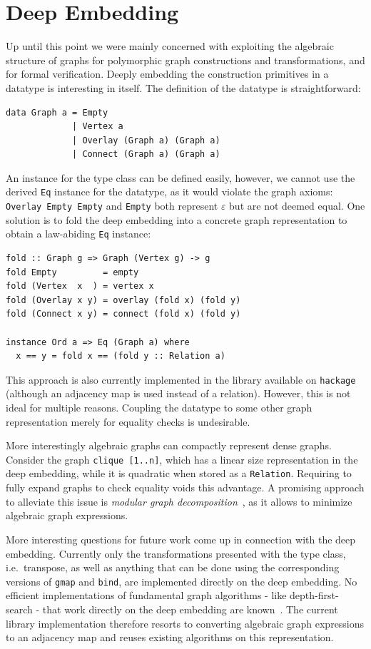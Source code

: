 \documentclass{article}
\newcommand{\hs}{\texttt}
\renewcommand{\epsilon}{\varepsilon}
\newcommand{\eps}{\epsilon}
\begin{document}
\section{Deep Embedding}\label{sec:deep}
Up until this point we were mainly concerned with exploiting the algebraic
structure of graphs for polymorphic graph constructions and transformations, and
for formal verification. Deeply embedding the construction primitives in a
datatype is interesting in itself. The definition of the datatype is
straightforward:
\begin{verbatim}
data Graph a = Empty
             | Vertex a
             | Overlay (Graph a) (Graph a)
             | Connect (Graph a) (Graph a)
\end{verbatim}
An instance for the type class can be defined easily, however, we cannot use the
derived \hs{Eq} instance for the datatype, as it would violate the graph axioms:
\hs{Overlay Empty Empty} and \hs{Empty} both represent $\eps$ but are not deemed
equal.
One solution is to fold the deep embedding into a concrete graph representation to
obtain a law-abiding \hs{Eq} instance:
\begin{verbatim}
fold :: Graph g => Graph (Vertex g) -> g
fold Empty         = empty
fold (Vertex  x  ) = vertex x
fold (Overlay x y) = overlay (fold x) (fold y)
fold (Connect x y) = connect (fold x) (fold y)

instance Ord a => Eq (Graph a) where
  x == y = fold x == (fold y :: Relation a)
\end{verbatim}
This approach is also currently implemented in the library available on
\texttt{hackage} (although an adjacency map is used instead of a relation).
However, this is not ideal for multiple reasons. Coupling the datatype to some
other graph representation merely for equality checks is undesirable.

More interestingly algebraic graphs can compactly represent dense graphs.
Consider the graph \hs{clique [1..n]}, which has a linear size representation in
the deep embedding, while it is quadratic when stored as a \hs{Relation}.
Requiring to fully expand graphs to check equality voids this advantage. A
promising approach to alleviate this issue is \textit{modular graph
  decomposition}~\cite{mcconnell2005linear}, as it allows to minimize algebraic
graph expressions.

More interesting questions for future work come up in connection with the deep
embedding. Currently only the transformations presented with the type class, i.e.\
transpose, as well as anything that can be done using the corresponding versions
of \hs{gmap} and \hs{bind}, are implemented directly on the deep embedding. No
efficient implementations of fundamental graph algorithms - like
depth-first-search - that work directly on the deep embedding are
known~\cite{mokhov2017algebraic}. The current library implementation therefore
resorts to converting algebraic graph expressions to an adjacency map and reuses
existing algorithms on this representation.
\end{document}
